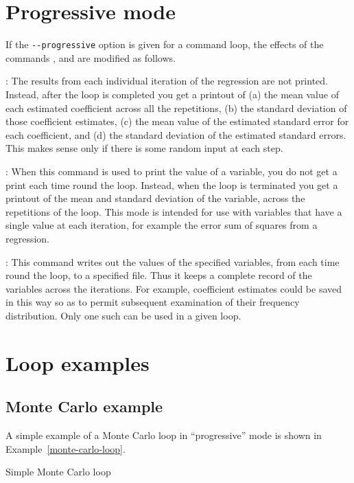 \section{Progressive mode}
\label{loop-progressive}

If the \verb+--progressive+ option is given for a command loop, the
effects of the commands ,  and  are
modified as follows.

: The results from each individual iteration of the
regression are not printed.  Instead, after the loop is completed you
get a printout of (a) the mean value of each estimated coefficient
across all the repetitions, (b) the standard deviation of those
coefficient estimates, (c) the mean value of the estimated standard
error for each coefficient, and (d) the standard deviation of the
estimated standard errors.  This makes sense only if there is some
random input at each step.

: When this command is used to print the value of a
variable, you do not get a print each time round the loop.  Instead,
when the loop is terminated you get a printout of the mean and
standard deviation of the variable, across the repetitions of the
loop.  This mode is intended for use with variables that have a single
value at each iteration, for example the error sum of squares from a
regression.

: This command writes out the values of the specified
variables, from each time round the loop, to a specified file.  Thus
it keeps a complete record of the variables across the iterations.
For example, coefficient estimates could be saved in this way so as to
permit subsequent examination of their frequency distribution. Only
one such  can be used in a given loop.

\section{Loop examples}
\label{loop-examples}


\subsection{Monte Carlo example}
\label{loop-mc-example}

A simple example of a Monte Carlo loop in ``progressive'' mode is
shown in Example~\ref{monte-carlo-loop}.

\begin{script}[htbp]
  \caption{Simple Monte Carlo loop}
  \label{monte-carlo-loop}
\end{script}

